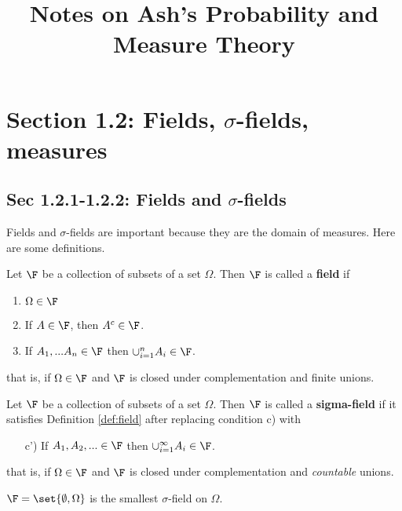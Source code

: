 \documentclass{article} %
\begin{document}
\title{Notes on Ash's Probability and Measure Theory} 
\maketitle
\tableofcontents
\newpage 
\section{Section 1.2: Fields, $\sigma$-fields, measures}

\subsection{Sec 1.2.1-1.2.2: Fields and $\sigma$-fields}

Fields and $\sigma$-fields are important because they are the domain of measures.  Here are some definitions.

\begin{definition}
Let $\F$ be a collection of subsets of a set $\Omega$.  Then $\F$ is called a \textbf{field} if 

\begin{enumerate}[label=\alph*)]
	\item $\Omega \in \F$ 
	\item If $A \in \F$, then $A^c \in \F$.
	\item If $A_1,...A_n \in \F$ then $\cup_{i=1}^n A_i \in \F$. 
\end{enumerate}
that is, if $\Omega \in \F$ and $\F$ is closed under complementation and finite unions.
\label{def:field}	
\end{definition}

\begin{definition}
Let $\F$ be a collection of subsets of a set $\Omega$.  Then $\F$ is called a \textbf{sigma-field} if it satisfies Definition \ref{def:field} after replacing condition c) with

\begin{enumerate}
	\item[c')] If $A_1,A_2, ... \in \F$ then $\cup_{i=1}^\infty A_i \in \F$. 
\end{enumerate}
that is, if $\Omega \in \F$ and $\F$ is closed under complementation and \textit{countable} unions.
\label{def:sigma-field}	
\end{definition}

\begin{example}
$\F =\set{\emptyset, \Omega}$ is the smallest $\sigma$-field on $\Omega$. 
\end{example}
\end{document}
